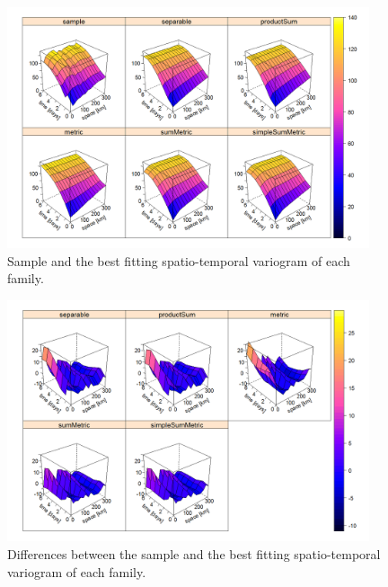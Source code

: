 \begin{figure}
\centering
\includegraphics[width=0.95\textwidth]{allVgmsWireframe.png}
\caption{Sample and the best fitting spatio-temporal variogram of each family.}\label{fig:allVgmsWireframe}
\end{figure}

\begin{figure}
\centering
\includegraphics[width=0.95\textwidth]{allVgmsDiffWireframe.png}
\caption{Differences between the sample and the best fitting spatio-temporal variogram of each family.}\label{fig:allVgmsDiffWireframe}
\end{figure}

